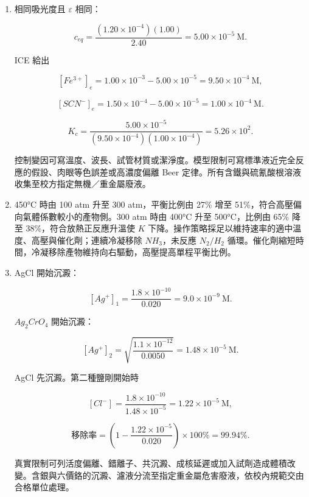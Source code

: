 \documentclass[11pt,a4paper]{article}
\begin{document}
\begin{enumerate}
  \[
  Q_c'=\frac{2[N_2O_4]}{(2[NO_2])^2}=\frac12K_c<K_c.
  \]

  \(NO_2\) 濃度立即升高使顏色變深，後續向右形成 \(N_2O_4\) 而逐漸變淡；定溫下 \(K_c\) 不變。待新平衡後定容升溫，組成在瞬間尚未改變，但放熱正反應的 \(K_c\) 變小，因此當下 \(Q_c>K_c(\text{高溫})\)，後續向左、\(NO_2\) 增加而變深。安全措施可列：全程通風櫥與密閉裝置；護目鏡與合適手套；尾氣以 NaOH 吸收並收集指定廢液；依 SDS 處理暴露。
\item
  相同吸光度且 \(\varepsilon\) 相同：

  \[
  c_{eq}=\frac{(1.20\times10^{-4})(1.00)}{2.40}
  =5.00\times10^{-5}\ \mathrm M.
  \]

  ICE 給出

  \[
  [Fe^{3+}]_e=1.00\times10^{-3}-5.00\times10^{-5}=9.50\times10^{-4}\ \mathrm M,
  \]

  \[
  [SCN^-]_e=1.50\times10^{-4}-5.00\times10^{-5}=1.00\times10^{-4}\ \mathrm M.
  \]

  \[
  K_c=\frac{5.00\times10^{-5}}{(9.50\times10^{-4})(1.00\times10^{-4})}
  =5.26\times10^2.
  \]

  控制變因可寫溫度、波長、試管材質或潔淨度。模型限制可寫標準液近完全反應的假設、肉眼等色誤差或高濃度偏離 Beer 定律。所有含鐵與硫氰酸根溶液收集至校方指定無機／重金屬廢液。
\item
  450°C 時由 100 atm 升至 300 atm，平衡比例由 27\% 增至 51\%，符合高壓偏向氣體係數較小的產物側。300 atm 時由 400°C 升至 500°C，比例由 65\% 降至 38\%，符合放熱正反應升溫使 \(K\) 下降。操作策略採足以維持速率的適中溫度、高壓與催化劑；連續冷凝移除 \(NH_3\)，未反應 \(N_2/H_2\) 循環。催化劑縮短時間，冷凝移除產物維持向右驅動，高壓提高單程平衡比例。
\item
  AgCl 開始沉澱：

  \[
  [Ag^+]_1=\frac{1.8\times10^{-10}}{0.020}=9.0\times10^{-9}\ \mathrm M.
  \]

  \(Ag_2CrO_4\) 開始沉澱：

  \[
  [Ag^+]_2=\sqrt{\frac{1.1\times10^{-12}}{0.0050}}
  =1.48\times10^{-5}\ \mathrm M.
  \]

  AgCl 先沉澱。第二種鹽剛開始時

  \[
  [Cl^-]=\frac{1.8\times10^{-10}}{1.48\times10^{-5}}
  =1.22\times10^{-5}\ \mathrm M,
  \]

  \[
  \text{移除率}=\left(1-\frac{1.22\times10^{-5}}{0.020}\right)\times100\%=99.94\%.
  \]

  真實限制可列活度偏離、錯離子、共沉澱、成核延遲或加入試劑造成體積改變。含銀與六價鉻的沉澱、濾液分流至指定重金屬危害廢液，依校內規範交由合格單位處理。
\end{enumerate}
\end{document}
